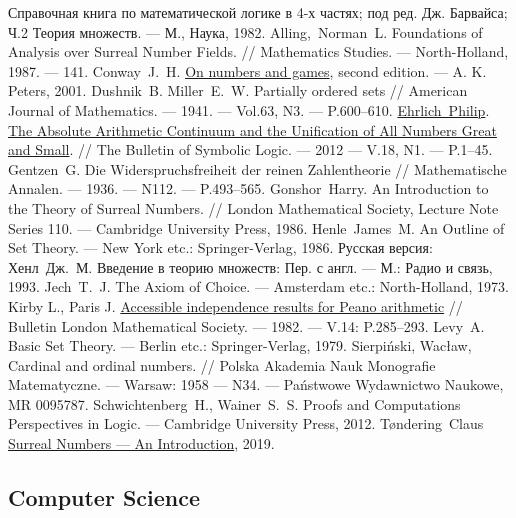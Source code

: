 \begin{thebibliography}{199}
 Справочная книга по математической логике в 4-х частях; под ред. Дж. Барвайса; Ч.2 Теория множеств. --- М., Наука, 1982.
 Alling,~Norman~L. Foundations of Analysis over Surreal Number Fields. // Mathematics Studies. --- North-Holland, 1987. --- 141.
 Conway~J.~H. \href{https://books.google.ru/books?id=tXiVo8qA5PQC&printsec=frontcover&hl=ru&source=gbs_ge_summary_r&cad=0#v=onepage&q&f=false}{On numbers and games}, second edition. --- A. K. Peters, 2001.
 Dushnik~B. Miller~E.~W. Partially ordered sets // American Journal of Mathematics. --- 1941. --- Vol.63, N3. --- P.600--610.
 \href{https://www.ohio.edu/cas/philosophy/contact/profiles.cfm?profile=EAC10AF4-5056-A874-1DB87777A64C4268}{Ehrlich~Philip}. \href{http://lumiere.ens.fr/~dbonnay/files/talks/ehrlich.pdf}{The Absolute Arithmetic Continuum and the Unification of All Numbers Great and Small}. // The Bulletin of Symbolic Logic. --- 2012 --- V.18, N1. --- P.1--45.
 Gentzen~G. Die Widerspruchsfreiheit der reinen Zahlentheorie // Mathematische Annalen. --- 1936. --- N112. --- P.493--565.
 Gonshor~Harry. An Introduction to the Theory of Surreal Numbers. // London
Mathematical Society, Lecture Note Series 110. --- Cambridge University Press, 1986.
 Henle~James~M. An Outline of Set Theory. --- New York etc.: Springer-Verlag, 1986. Русская версия: Хенл~Дж.~М. Введение в теорию множеств: Пер. с англ. --- М.: Радио и связь, 1993.
 Jech~T.~J. The Axiom of Choice. --- Amsterdam etc.: North-Holland, 1973.
 Kirby L., Paris J. \href{http://citeseerx.ist.psu.edu/viewdoc/summary?doi=10.1.1.107.3303}{Accessible independence results for Peano arithmetic} // Bulletin London Mathematical Society. --- 1982. --- V.14: P.285--293.
 Levy~A. Basic Set Theory. --- Berlin etc.: Springer-Verlag, 1979.
 Sierpiński, Wacław, Cardinal and ordinal numbers. // Polska Akademia Nauk Monografie Matematyczne. --- Warsaw: 1958 --- N34. --- Państwowe Wydawnictwo Naukowe, MR 0095787.
 Schwichtenberg~H., Wainer~S.~S. Proofs and Computations Perspectives in Logic. --- Cambridge University Press, 2012.
 Tøndering~Claus \href{https://www.tondering.dk/download/sur.pdf}{Surreal Numbers --- An Introduction}, 2019.

\subsection*{Computer Science}


\end{thebibliography}
